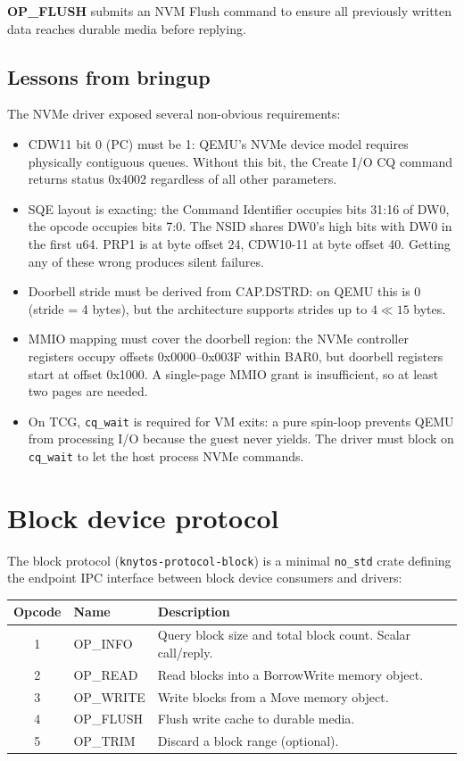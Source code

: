 \textbf{OP\_FLUSH} submits an NVM Flush command to ensure all previously
written data reaches durable media before replying.

\subsection{Lessons from bringup}

The NVMe driver exposed several non-obvious requirements:

\begin{itemize}
    \item CDW11 bit 0 (PC) must be 1: QEMU's NVMe device model
        requires physically contiguous queues. Without this bit, the Create
        I/O CQ command returns status 0x4002 regardless of all other
        parameters.
    \item SQE layout is exacting: the Command Identifier occupies
        bits 31:16 of DW0, the opcode occupies bits 7:0. The NSID shares
        DW0's high bits with DW0 in the first u64. PRP1 is at byte offset
        24, CDW10-11 at byte offset 40. Getting any of these wrong produces
        silent failures.
    \item Doorbell stride must be derived from CAP.DSTRD: on QEMU
        this is 0 (stride = 4 bytes), but the architecture supports strides
        up to $4 \ll 15$ bytes.
    \item MMIO mapping must cover the doorbell region: the NVMe
        controller registers occupy offsets 0x0000--0x003F within BAR0, but
        doorbell registers start at offset 0x1000. A single-page MMIO grant
        is insufficient, so at least two pages are needed.
    \item On TCG, \texttt{cq\_wait} is required for VM exits: a
        pure spin-loop prevents QEMU from processing I/O because the guest
        never yields. The driver must block on \texttt{cq\_wait} to let the
        host process NVMe commands.
\end{itemize}

\section{Block device protocol}

The block protocol (\texttt{knytos-protocol-block}) is a minimal
\texttt{no\_std} crate defining the endpoint IPC interface between block
device consumers and drivers:

\begin{longtable}{|c|l|p{7cm}|}
\hline
\textbf{Opcode} & \textbf{Name} & \textbf{Description} \\
\hline
1 & OP\_INFO & Query block size and total block count. Scalar call/reply. \\
2 & OP\_READ & Read blocks into a BorrowWrite memory object. \\
3 & OP\_WRITE & Write blocks from a Move memory object. \\
4 & OP\_FLUSH & Flush write cache to durable media. \\
5 & OP\_TRIM & Discard a block range (optional). \\
\hline
\end{longtable}

